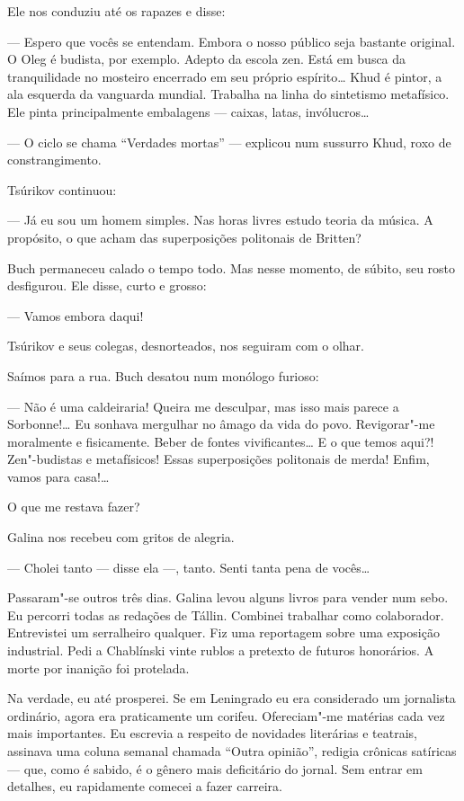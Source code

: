 Ele nos conduziu até os rapazes e disse:

--- Espero que vocês se entendam. Embora o nosso público seja bastante
original. O Oleg é budista, por exemplo. Adepto da escola zen. Está em
busca da tranquilidade no mosteiro encerrado em seu próprio espírito\ldots{}
Khud é pintor, a ala esquerda da vanguarda mundial. Trabalha na linha do sintetismo metafísico. Ele pinta principalmente
embalagens --- caixas, latas, invólucros\ldots{}

--- O ciclo se chama ``Verdades mortas'' --- explicou num sussurro Khud,
roxo de constrangimento.

Tsúrikov continuou:

--- Já eu sou um homem simples. Nas horas livres estudo teoria da
música. A propósito, o que acham das superposições politonais de
Britten?

Buch permaneceu calado o tempo todo. Mas nesse momento, de súbito, seu
rosto desfigurou. Ele disse, curto e grosso:

--- Vamos embora daqui!

Tsúrikov e seus colegas, desnorteados, nos seguiram com o olhar.

Saímos para a rua. Buch desatou num monólogo furioso:

--- Não é uma caldeiraria! Queira me desculpar, mas isso mais parece a
Sorbonne!\ldots{} Eu sonhava mergulhar no âmago da vida do povo. Revigorar"-me
moralmente e fisicamente. Beber de fontes vivificantes\ldots{} E
o que temos aqui?! Zen"-budistas e metafísicos! Essas superposições
politonais de merda! Enfim, vamos para casa!\ldots{}

O que me restava fazer?

Galina nos recebeu com gritos de alegria.

--- Cholei tanto --- disse ela ---, tanto. Senti tanta pena de vocês\ldots{}

Passaram"-se outros três dias. Galina levou alguns livros para vender num
sebo. Eu percorri todas as redações de Tállin. Combinei trabalhar como
colaborador. Entrevistei um serralheiro qualquer. Fiz uma reportagem
sobre uma exposição industrial. Pedi a Chablínski vinte rublos a
pretexto de futuros honorários. A morte por inanição foi protelada.

Na verdade, eu até prosperei. Se em Leningrado eu era considerado um
jornalista ordinário, agora era praticamente um corifeu. Ofereciam"-me
matérias cada vez mais importantes. Eu escrevia a respeito de novidades
literárias e teatrais, assinava uma coluna semanal chamada
``Outra opinião'', redigia crônicas satíricas --- que, como
é sabido, é o gênero mais deficitário do jornal. Sem entrar em detalhes,
eu rapidamente comecei a fazer carreira.

